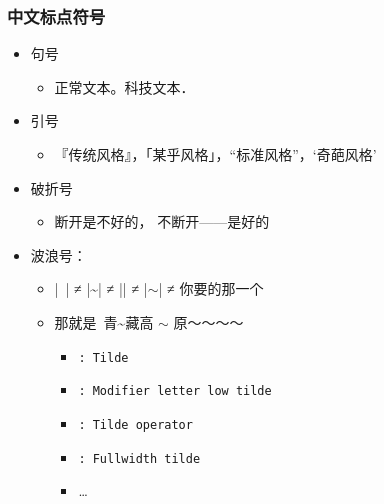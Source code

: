 \begin{frame}[fragile]
\frametitle{中文标点符号}
\begin{itemize}
  \item 句号
    \begin{itemize}
      \item 正常文本。科技文本．
    \end{itemize}
  \item 引号
    \begin{itemize}
      \item 『传统风格』，「某乎风格」，“标准风格”，‘奇葩风格’
    \end{itemize}
  \item 破折号
    \begin{itemize}
      \item 断开{}是不好的，
            不断开——是好的
    \end{itemize}
  \item 波浪号：
    \begin{itemize}
      \item |~| ≠ |\textasciitilde| ≠ |\texttildelow| ≠ |$\sim$| ≠ 你要的那一个
      \item 那就是~青\textasciitilde 藏\texttildelow 高 $\sim$ 原～～～～
        \begin{itemize}
          \item \texttt{: Tilde}
          \item \texttt{: Modifier letter low tilde}
          \item \texttt{: Tilde operator}
          \item \texttt{: Fullwidth tilde}
          \item \ldots{}
        \end{itemize}
    \end{itemize}
\end{itemize}
\end{frame}

